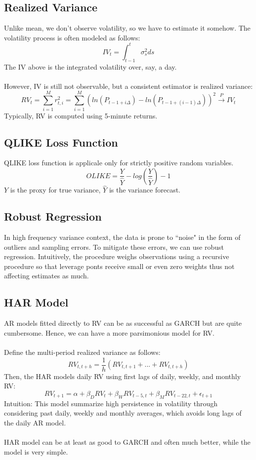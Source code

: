 \documentclass{article}
\begin{document}
\subsection{Realized Variance}
Unlike mean, we don't observe volatility, so we have to estimate it somehow. The volatility process is often modeled as follows:
$$IV_t = \int_{t-1}^t \sigma_s^2 ds$$
The IV above is the integrated volatility over, say, a day.\\
\\
However, IV is still not observable, but a consistent estimator is realized variance:
$$RV_t = \sum_{i=1}^M r_{t,i}^2 = \sum_{i=1}^M (ln(P_{t-1+i\Delta}) - ln(P_{t-1+(i-1)\Delta}))^2 \xrightarrow{P} IV_t$$
Typically, RV is computed using 5-minute returns.

\subsection{QLIKE Loss Function}
QLIKE loss function is applicale only for strictly positive random variables.
$$OLIKE = \frac{Y}{\hat{Y}} - log\left(\frac{Y}{\hat{Y}}\right) - 1$$
$Y$ is the proxy for true variance, $\hat{Y}$ is the variance forecast.

\subsection{Robust Regression}
In high frequency variance context, the data is prone to ``noise" in the form of outliers and sampling errors. To mitigate these errors, we can use robust regression. Intuitively, the procedure weighs observations using a recursive procedure so that leverage ponts receive small or even zero weights thus not affecting estimates as much.

\subsection{HAR Model}
AR models fitted directly to RV can be as successful as GARCH but are quite cumbersome. Hence, we can have a more parsimonious model for RV.\\
\\
Define the multi-period realized variance as follows:
$$RV_{t, t+h} = \frac{1}{h}(RV_{t, t+1} + ... + RV_{t, t+h})$$
Then, the HAR models daily RV using first lags of daily, weekly, and monthly RV:
$$RV_{t+1} = \alpha + \beta_D RV_t + \beta_W RV_{t-5, t} + \beta_M RV_{t-22, t} + \epsilon_{t+1}$$
Intuition: This model summarize high persistence in volatility through considering past daily, weekly and monthly averages, which avoids long lags of the daily AR model.\\
\\
HAR model can be at least as good to GARCH and often much better, while the model is very simple.
\end{document}

